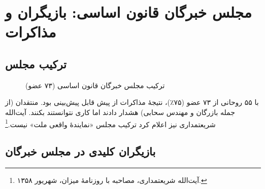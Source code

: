 \documentclass[12pt,a4paper]{book}
\begin{document}
\section{مجلس خبرگان قانون اساسی: بازیگران و مذاکرات}

\subsection{ترکیب مجلس}

\begin{figure}[H]
\centering
{}
\caption{ترکیب مجلس خبرگان قانون اساسی (۷۳ عضو)}
\label{fig:experts-composition}
\end{figure}

\begin{warningBox}
با ۵۵ روحانی از ۷۳ عضو (۷۵٪)، نتیجهٔ مذاکرات از پیش قابل پیش‌بینی بود. منتقدان (از جمله بازرگان و مهندس سحابی) هشدار دادند اما کاری نتوانستند بکنند. آیت‌الله شریعتمداری نیز اعلام کرد ترکیب مجلس «نمایندهٔ واقعی ملت» نیست.\footnote{آیت‌الله شریعتمداری، مصاحبه با روزنامهٔ میزان، شهریور ۱۳۵۸.}
\end{warningBox}

\subsection{بازیگران کلیدی در مجلس خبرگان}
\end{document}
